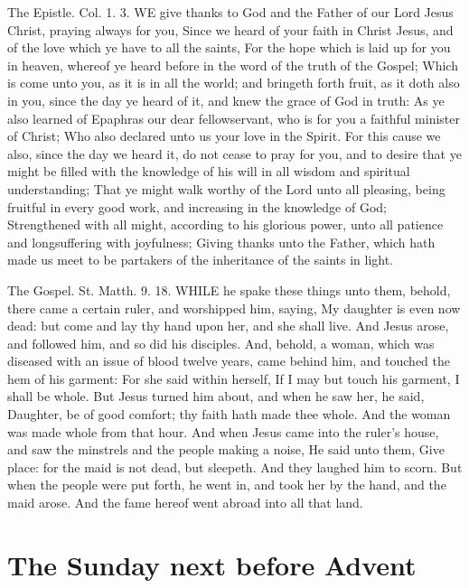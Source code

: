 The Epistle. Col. 1. 3.
WE give thanks to God and the Father of our Lord Jesus Christ, praying always for you, Since we heard of your faith in Christ Jesus, and of the love which ye have to all the saints, For the hope which is laid up for you in heaven, whereof ye heard before in the word of the truth of the Gospel; Which is come unto you, as it is in all the world; and bringeth forth fruit, as it doth also in you, since the day ye heard of it, and knew the grace of God in truth: As ye also learned of Epaphras our dear fellowservant, who is for you a faithful minister of Christ; Who also declared unto us your love in the Spirit. For this cause we also, since the day we heard it, do not cease to pray for you, and to desire that ye might be filled with the knowledge of his will in all wisdom and spiritual understanding; That ye might walk worthy of the Lord unto all pleasing, being fruitful in every good work, and increasing in the knowledge of God; Strengthened with all might, according to his glorious power, unto all patience and longsuffering with joyfulness; Giving thanks unto the Father, which hath made us meet to be partakers of the inheritance of the saints in light.


The Gospel. St. Matth. 9. 18.
WHILE he spake these things unto them, behold, there came a certain ruler, and worshipped him, saying, My daughter is even now dead: but come and lay thy hand upon her, and she shall live. And Jesus arose, and followed him, and so did his disciples. And, behold, a woman, which was diseased with an issue of blood twelve years, came behind him, and touched the hem of his garment: For she said within herself, If I may but touch his garment, I shall be whole. But Jesus turned him about, and when he saw her, he said, Daughter, be of good comfort; thy faith hath made thee whole. And the woman was made whole from that hour. And when Jesus came into the ruler's house, and saw the minstrels and the people making a noise, He said unto them, Give place: for the maid is not dead, but sleepeth. And they laughed him to scorn. But when the people were put forth, he went in, and took her by the hand, and the maid arose. And the fame hereof went abroad into all that land.

\section{The Sunday next before Advent} %
